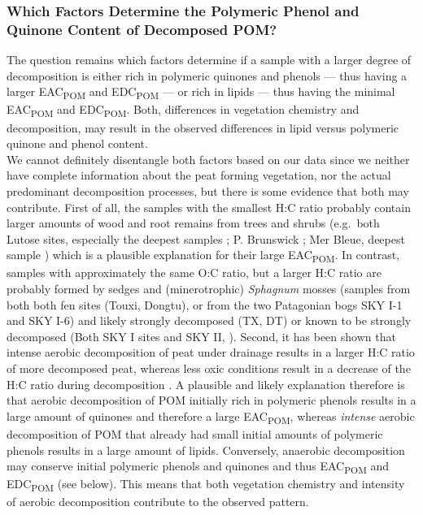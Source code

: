 \documentclass[alpha-refs]{wiley-article-rmd}
\begin{document}
\begin{refsection}
\hypertarget{which-factors-determine-the-polymeric-phenol-and-quinone-content-of-decomposed-pom}{%
\subsubsection{Which Factors Determine the Polymeric Phenol and Quinone Content of Decomposed POM?}\label{which-factors-determine-the-polymeric-phenol-and-quinone-content-of-decomposed-pom}}

The question remains which factors determine if a sample with a larger degree of decomposition is either rich in polymeric quinones and phenols --- thus having a larger EAC\textsubscript{POM} and EDC\textsubscript{POM} --- or rich in lipids --- thus having the minimal EAC\textsubscript{POM} and EDC\textsubscript{POM}. Both, differences in vegetation chemistry and decomposition, may result in the observed differences in lipid versus polymeric quinone and phenol content.\\
We cannot definitely disentangle both factors based on our data since we neither have complete information about the peat forming vegetation, nor the actual predominant decomposition processes, but there is some evidence that both may contribute. First of all, the samples with the smallest H:C ratio probably contain larger amounts of wood and root remains from trees and shrubs (e.g.~both Lutose sites, especially the deepest samples \autocite{Heffernan.2020}; P. Brunswick \autocite{Broder.2012}; Mer Bleue, deepest sample \autocite{Elliott.2012}) which is a plausible explanation for their large EAC\textsubscript{POM}. In contrast, samples with approximately the same O:C ratio, but a larger H:C ratio are probably formed by sedges and (minerotrophic) \emph{Sphagnum} mosses (samples from both both fen sites (Touxi, Dongtu), or from the two Patagonian bogs SKY I-1 and SKY I-6) and likely strongly decomposed (TX, DT) or known to be strongly decomposed (Both SKY I sites and SKY II, \textcite{Broder.2012}). Second, it has been shown that intense aerobic decomposition of peat under drainage results in a larger H:C ratio of more decomposed peat, whereas less oxic conditions result in a decrease of the H:C ratio during decomposition \autocite{Leifeld.2012}. A plausible and likely explanation therefore is that aerobic decomposition of POM initially rich in polymeric phenols results in a large amount of quinones and therefore a large EAC\textsubscript{POM}, whereas \emph{intense} aerobic decomposition of POM that already had small initial amounts of polymeric phenols results in a large amount of lipids. Conversely, anaerobic decomposition may conserve initial polymeric phenols and quinones and thus EAC\textsubscript{POM} and EDC\textsubscript{POM} (see below). This means that both vegetation chemistry and intensity of aerobic decomposition contribute to the observed pattern.


\end{refsection}
\end{document}
